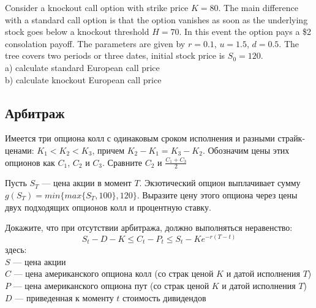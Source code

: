 \begin{problem}
 Consider a knockout call option with strike price $K=80$. The main difference with a standard call option is that the option vanishes as soon as the underlying stock goes below a knockout threshold $H=70$. In this event the option pays a \$2 consolation payoff. The parameters are given by $r=0.1$, $u=1.5$, $d=0.5$. The tree covers two periods or three dates, initial stock price is $S_{0}=120$. \\
a) calculate standard European call price \\
b) calculate knockout European call price 
\end{problem} 
\begin{solution} 
\end{solution}



\subsection{Арбитраж} 

\begin{problem}
Имеется три опциона колл с одинаковым сроком исполнения и разными страйк-ценами: $K_{1}<K_{2}<K_{3}$, причем $K_{2}-K_{1}=K_{3}-K_{2}$. Обозначим цены этих опционов как $C_{1}$, $C_{2}$ и $C_{3}$. Сравните $C_{2}$ и $\frac{C_{1}+C_{3}}{2}$  
\end{problem} 
\begin{solution} 

\end{solution}

\begin{problem}
 Пусть $S_{T}$ --- цена акции в момент $T$. Экзотический опцион выплачивает сумму $g(S_{T})=min\{max\{S_{T},100\},120\}$. Выразите цену этого опциона через цены двух подходящих опционов колл и процентную ставку. 
\end{problem} 
\begin{solution} 

\end{solution}

\begin{problem}
Докажите, что при отсутствии арбитража, должно выполняться неравенство: 
\[
S_{t}-D-K\le C_{t}-P_{t}\le S_{t}-Ke^{-r(T-t)}
\]
здесь:\\
$S$ --- цена акции \\
$C$ --- цена американского опциона колл (со страк ценой $K$ и датой исполнения $T$)\\
$P$ --- цена американского опциона пут (со страк ценой $K$ и датой исполнения $T$)\\
$D$ --- приведенная к моменту $t$ стоимость дивидендов 
\end{problem} 
\begin{solution} 
\end{solution}



